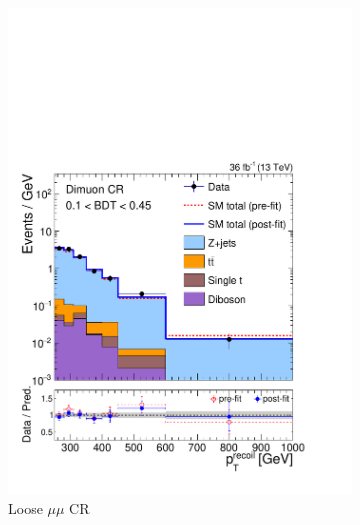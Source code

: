 \begin{figure}[]
    \begin{center}
        \begin{subfigure}[t]{0.24\textwidth}
            \includegraphics[width=\textwidth]{figures/monotop/postfit/stackedPostfit_dimuon_monotop_loose.pdf}
            \caption{Loose $\mu\mu$ CR}
        \end{subfigure}
        \begin{subfigure}[t]{0.24\textwidth}

\end{subfigure}
\end{center}
\end{figure}
